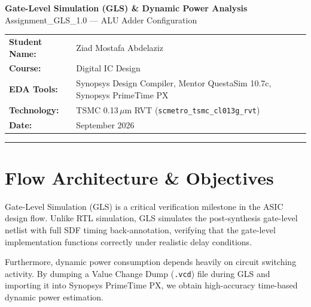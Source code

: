 \documentclass[12pt,a4paper]{article}
\begin{document}
\begin{titlepage}
\centering
\vspace*{1.5cm}
{\Huge\bfseries\color{headerblue} Gate-Level Simulation (GLS) \& Dynamic Power Analysis\\[0.3em]}
{\Large\color{gray} Assignment\_GLS\_1.0 — ALU Adder Configuration\\[2.5cm]}

\begin{tabular}{ll}
\textbf{Student Name:} & Ziad Mostafa Abdelaziz \\[0.5em]
\textbf{Course:}       & Digital IC Design \\[0.5em]
\textbf{EDA Tools:}    & Synopsys Design Compiler, Mentor QuestaSim 10.7c, Synopsys PrimeTime PX \\[0.5em]
\textbf{Technology:}   & TSMC 0.13\,$\mu$m RVT (\texttt{scmetro\_tsmc\_cl013g\_rvt}) \\[0.5em]
\textbf{Date:}         & September 2026 \\
\end{tabular}

\vfill
\rule{\linewidth}{1pt}
\end{titlepage}

\tableofcontents
\newpage

\section{Flow Architecture \& Objectives}

Gate-Level Simulation (GLS) is a critical verification milestone in the ASIC design flow. Unlike RTL simulation, GLS simulates the post-synthesis gate-level netlist with full SDF timing back-annotation, verifying that the gate-level implementation functions correctly under realistic delay conditions.

Furthermore, dynamic power consumption depends heavily on circuit switching activity. By dumping a Value Change Dump (\texttt{.vcd}) file during GLS and importing it into Synopsys PrimeTime PX, we obtain high-accuracy time-based dynamic power estimation.
\end{document}
